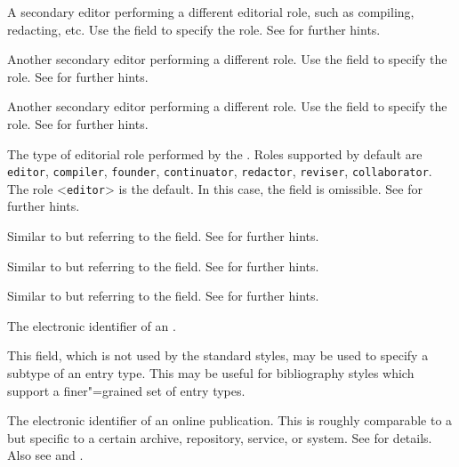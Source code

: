 \documentclass{ltxdockit}[2011/03/25]
\begin{document}
\begin{fieldlist}

A secondary editor performing a different editorial role, such as compiling, redacting, etc. Use the  field to specify the role. See  for further hints.


Another secondary editor performing a different role. Use the  field to specify the role. See  for further hints.


Another secondary editor performing a different role. Use the  field to specify the role. See  for further hints.


The type of editorial role performed by the . Roles supported by default are \texttt{editor}, \texttt{compiler}, \texttt{founder}, \texttt{continuator}, \texttt{redactor}, \texttt{reviser}, \texttt{collaborator}. The role <\texttt{editor}> is the default. In this case, the field is omissible. See  for further hints.


Similar to  but referring to the  field. See  for further hints.


Similar to  but referring to the  field. See  for further hints.


Similar to  but referring to the  field. See  for further hints.


The electronic identifier of an .


This field, which is not used by the standard styles, may be used to specify a subtype of an entry type. This may be useful for bibliography styles which support a finer"=grained set of entry types.


The electronic identifier of an online publication. This is roughly comparable to a  but specific to a certain archive, repository, service, or system. See  for details. Also see  and .


\end{fieldlist}
\end{document}

